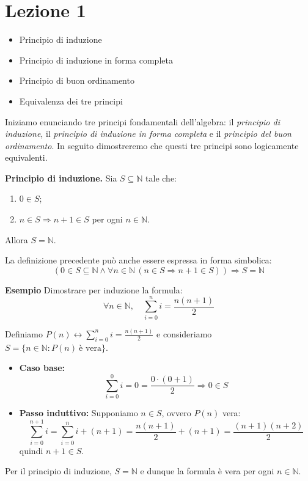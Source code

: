 \section{Lezione 1}
\begin{lezionebox}
\begin{itemize}
  \item Principio di induzione
  \item Principio di induzione in forma completa
  \item Principio di buon ordinamento
  \item Equivalenza dei tre principi
\end{itemize}
\end{lezionebox}

Iniziamo enunciando tre principi fondamentali dell'algebra: il \emph{principio di induzione}, il \emph{principio di induzione in forma completa} e il \emph{principio del buon ordinamento}. In seguito dimostreremo che questi tre principi sono logicamente equivalenti.



\begin{definitionbox}
\textbf{Principio di induzione.} Sia $S \subseteq \mathbb{N}$ tale che:
\begin{enumerate}[label=(\roman*)]
    \item $0 \in S$;
    \item $n \in S \Rightarrow n+1 \in S$ per ogni $n \in \mathbb{N}$.
\end{enumerate}
Allora $S = \mathbb{N}$.
\end{definitionbox}

La definizione precedente può anche essere espressa in forma simbolica:
\[
\left(0 \in S \subseteq \mathbb{N} \land \forall n \in \mathbb{N} \, (n \in S \Rightarrow n+1 \in S)\right) \Rightarrow S = \mathbb{N}
\]

\begin{examplebox}
\textbf{Esempio } Dimostrare per induzione la formula:
\[
\forall n \in \mathbb{N}, \quad \sum_{i=0}^n i = \frac{n(n+1)}{2}
\]

Definiamo $P(n) \leftrightarrow \sum_{i=0}^n i = \frac{n(n+1)}{2}$ e consideriamo $S = \{n \in \mathbb{N} : P(n)\ \text{è vera} \}$.

\begin{itemize}
    \item \textbf{Caso base:} 
    \[
    \sum_{i=0}^0 i = 0 = \frac{0\cdot(0+1)}{2} \Rightarrow 0 \in S
    \]

    \item \textbf{Passo induttivo:} Supponiamo $n \in S$, ovvero $P(n)$ vera:
    \[
    \sum_{i=0}^{n+1} i = \sum_{i=0}^n i + (n+1) = \frac{n(n+1)}{2} + (n+1)
    = \frac{(n+1)(n+2)}{2}
    \]
    quindi $n+1 \in S$.
\end{itemize}

Per il principio di induzione, $S = \mathbb{N}$ e dunque la formula è vera per ogni $n \in \mathbb{N}$.
\end{examplebox}



